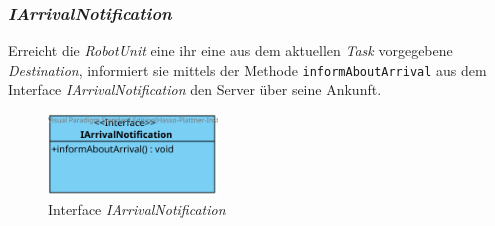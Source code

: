 	\subsubsection{\textit{IArrivalNotification}}
	Erreicht die \textit{RobotUnit} eine ihr eine aus dem aktuellen \textit{Task} vorgegebene \textit{Destination}, informiert sie mittels der Methode \texttt{informAboutArrival} aus dem Interface \textit{IArrivalNotification} den Server über seine Ankunft.
	\begin{figure}[H]
	\centering
	\includegraphics[width=0.4\textwidth]{img/2-Entwurf-3-IArrivalNotification}
	\caption{Interface \emph{IArrivalNotification}}
	\label{IArrivaleNotification}
	\end{figure}
